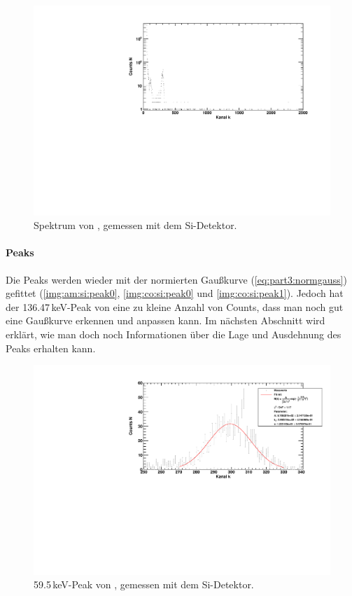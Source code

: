 \begin{figure}[H]
\begin{center}
  \includegraphics[width=\textwidth]{../img/part3/Am-Si_spectrum.pdf}
  \caption{Spektrum von \am, gemessen mit dem Si-Detektor.}
  \label{img:si:am:spektrum}
\end{center}
\end{figure}

\paragraph{Peaks}
Die Peaks werden wieder mit der normierten Gaußkurve (\autoref{eq:part3:normgauss}) gefittet 
(\autoref{img:am:si:peak0}, \autoref{img:co:si:peak0} und \autoref{img:co:si:peak1}). Jedoch hat der 136.47\,keV-Peak von \co eine zu kleine 
Anzahl von Counts, dass man noch gut eine Gaußkurve erkennen und anpassen kann. Im nächsten Abschnitt wird erklärt, wie man doch noch 
Informationen über die Lage und Ausdehnung des Peaks erhalten kann.
\begin{figure}[H]
\begin{center}
  \includegraphics[width=\textwidth]{../img/part3/Am-Si_00.pdf}
  \caption{59.5\,keV-Peak von \am, gemessen mit dem Si-Detektor.}
  \label{img:am:si:peak0}
\end{center}
\end{figure}

